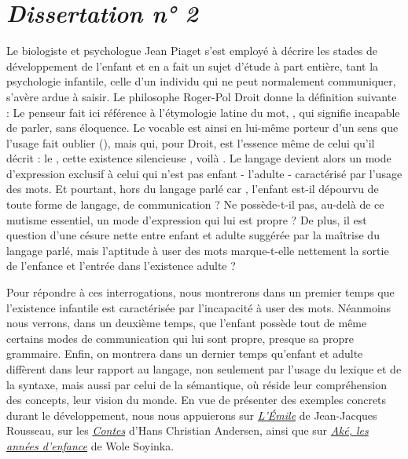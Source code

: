 \documentclass[a4paper,french,bookmarks]{article}
\begin{document}


\section*{\centering\EBGaramond\Large\itshape Dissertation n° 2}

\qquad Le biologiste et psychologue Jean Piaget s'est employé à décrire les stades de développement de l'enfant et en a fait un sujet d'étude à part entière, tant la psychologie infantile, celle d'un individu qui ne peut normalement communiquer, s'avère ardue à saisir. Le philosophe Roger-Pol Droit donne la définition suivante :  Le penseur fait ici référence à l'étymologie latine du mot, , qui signifie incapable de parler, sans éloquence. Le vocable  est ainsi en lui-même porteur d'un sens que l'usage fait oublier (), mais qui, pour Droit, est l'essence même de celui qu'il décrit : le , cette existence silencieuse , voilà . Le langage devient alors un mode d'expression exclusif à celui qui n'est pas enfant - l'adulte - caractérisé par l'usage des mots. Et pourtant, hors du langage parlé car , l'enfant est-il dépourvu de toute forme de langage, de communication ? Ne possède-t-il pas, au-delà de ce mutisme essentiel, un mode d'expression qui lui est propre ? De plus, il est question d'une césure nette entre enfant et adulte suggérée par la maîtrise du langage parlé, mais l'aptitude à user des mots marque-t-elle nettement la sortie de l'enfance et l'entrée dans l'existence adulte ? 

\qquad Pour répondre à ces interrogations, nous montrerons dans un premier temps que l'existence infantile est caractérisée par l'incapacité à user des mots. Néanmoins nous verrons, dans un deuxième temps, que l'enfant possède tout de même certains modes de communication qui lui sont propre, presque sa propre grammaire. Enfin, on montrera dans un dernier temps qu'enfant et adulte diffèrent dans leur rapport au langage, non seulement par l'usage du lexique et de la syntaxe, mais aussi par celui de la sémantique, où réside leur compréhension des concepts, leur vision du monde. En vue de présenter des exemples concrets durant le développement, nous nous appuierons sur \underline{\itshape L'Émile} de Jean-Jacques Rousseau, sur les \underline{\itshape Contes} d'Hans Christian Andersen, ainsi que sur \underline{\itshape Aké, les années d'enfance} de Wole Soyinka.  
\end{document}
